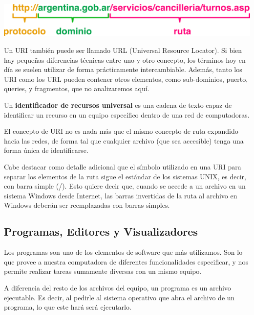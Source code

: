 \vspace{0.5cm}
\centerline{\includegraphics[]{capitulos/informatica/imagenes/uris.png}}

Un URI también puede ser llamado URL (Universal Resource Locator). Si bien hay
pequeñas diferencias técnicas entre uno y otro concepto, los términos hoy en día
se suelen utilizar de forma prácticamente intercambiable. Además, tanto los URI
como los URL pueden contener otros elementos, como sub-dominios, puerto, queries,
y fragmentos, que no analizaremos aquí.

\begin{definition}
    Un \textbf{identificador de recursos universal} es una cadena de texto
    capaz de identificar un recurso en un equipo específico dentro de una
    red de computadoras.
\end{definition}

El concepto de URI no es nada más que el mismo concepto de ruta expandido hacia
las redes, de forma tal que cualquier archivo (que sea accesible) tenga una forma
única de identificarse.

Cabe destacar como detalle adicional que el símbolo utilizado en una URI para
separar los elementos de la ruta sigue el estándar de los sistemas UNIX, es decir,
con barra símple (/). Esto quiere decir que, cuando se accede a un archivo en un
sistema Windows desde Internet, las barras invertidas de la ruta al archivo en
Windows deberán ser reemplazadas con barras simples.

\subsection{Programas, Editores y Visualizadores}

Los programas son uno de los elementos de software que más utilizamos. Son lo que
provee a nuestra computadora de diferentes funcionalidades especificar, y nos
permite realizar tareas sumamente diversas con un mismo equipo.

A diferencia del resto de los archivos del equipo, un programa es un
archivo ejecutable. Es decir, al pedirle al sistema operativo que abra el
archivo de un programa, lo que este hará será ejecutarlo.

